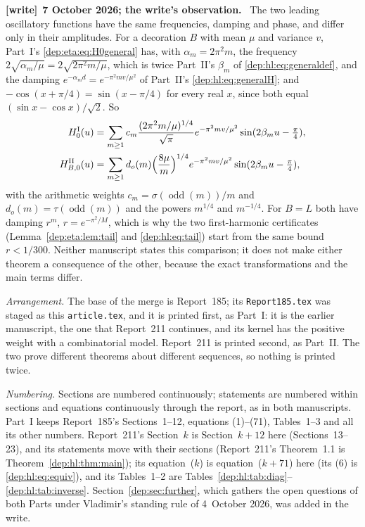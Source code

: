 \documentclass[11pt]{article}
\theoremstyle{definition}\newtheorem{definition}[theorem]{Definition}
\theoremstyle{remark}\newtheorem{remark}[theorem]{Remark}
\newcommand{\odd}{\operatorname{odd}}
\newcommand{\file}[1]{\nolinkurl{#1}}
\newenvironment{writenote}[1][]{\par\smallskip\begingroup\small
 \noindent\textbf{[write]}\if\relax\detokenize{#1}\relax\else~\textbf{#1.}\fi\ }%
 {\par\endgroup\smallskip}
\begin{document}
\begin{writenote}[7 October 2026; the write's observation]
The two leading oscillatory functions have the same frequencies, damping and
phase, and differ only in their amplitudes. For a decoration $B$ with mean
$\mu$ and variance $v$, Part~I's \eqref{dep:eta:eq:H0general} has, with
$\alpha_m=2\pi^2m$, the frequency $2\sqrt{\alpha_m/\mu}=2\sqrt{2\pi^2m/\mu}$,
which is twice Part~II's $\beta_m$ of \eqref{dep:hl:eq:generaldef}, and the
damping $e^{-\alpha_md}=e^{-\pi^2mv/\mu^2}$ of Part~II's
\eqref{dep:hl:eq:generalH}; and $-\cos(x+\pi/4)=\sin(x-\pi/4)$ for every real
$x$, since both equal $(\sin x-\cos x)/\sqrt2$. So
\begin{align*}
 H_0^{\mathrm I}(u)&=\sum_{m\ge1}c_m\frac{(2\pi^2m/\mu)^{1/4}}{\sqrt\pi}e^{-\pi^2mv/\mu^2}\sin(2\beta_mu-\tfrac\pi4),\\
 H_{B,0}^{\mathrm{II}}(u)&=\sum_{m\ge1}d_o(m)\Bigl(\frac{8\mu}m\Bigr)^{1/4}e^{-\pi^2mv/\mu^2}\sin(2\beta_mu-\tfrac\pi4),
\end{align*}
with the arithmetic weights $c_m=\sigma(\odd(m))/m$ and $d_o(m)=\tau(\odd(m))$
and the powers $m^{1/4}$ and $m^{-1/4}$. For $B=L$ both have damping
$r^m$, $r=e^{-\pi^2/M}$, which is why the two first-harmonic certificates
(Lemma~\ref{dep:eta:lem:tail} and \eqref{dep:hl:eq:tail}) start from the same
bound $r<1/300$. Neither manuscript states this comparison; it does not make
either theorem a consequence of the other, because the exact transformations
and the main terms differ.
\end{writenote}

\emph{Arrangement.} The base of the merge is Report~185; its
\file{Report185.tex} was staged as this \file{article.tex}, and it is printed
first, as Part~I: it is the earlier manuscript, the one that Report~211
continues, and its kernel has the positive weight with a combinatorial model.
Report~211 is printed second, as Part~II. The two prove different theorems
about different sequences, so nothing is printed twice.

\emph{Numbering.} Sections are numbered continuously; statements are
numbered within sections and equations continuously through the report, as in
both manuscripts. Part~I keeps Report~185's Sections~1--12, equations
(1)--(71), Tables~1--3 and all its other numbers. Report~211's Section~$k$ is
Section~$k+12$ here (Sections~13--23), and its statements move with their
sections (Report~211's Theorem~1.1 is Theorem~\ref{dep:hl:thm:main}); its
equation~($k$) is equation~($k+71$) here (its (6) is \eqref{dep:hl:eq:equiv}),
and its Tables~1--2 are Tables~\ref{dep:hl:tab:diag}--\ref{dep:hl:tab:inverse}. Section~\ref{dep:sec:further}, which gathers
the open questions of both Parts under Vladimir's standing rule of 4~October
2026, was added in the write.
\end{document}
